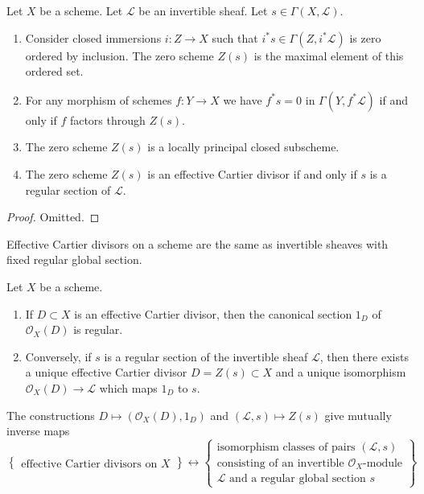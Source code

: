 \begin{lemma}
\label{lemma-zero-scheme}
Let $X$ be a scheme.
Let $\mathcal{L}$ be an invertible sheaf.
Let $s \in \Gamma(X, \mathcal{L})$.
\begin{enumerate}
\item Consider closed immersions $i : Z \to X$ such that
$i^*s \in \Gamma(Z, i^*\mathcal{L})$ is zero
ordered by inclusion. The zero scheme $Z(s)$ is the
maximal element of this ordered set.
\item For any morphism of schemes $f : Y \to X$ we have
$f^*s = 0$ in $\Gamma(Y, f^*\mathcal{L})$ if and only if
$f$ factors through $Z(s)$.
\item The zero scheme $Z(s)$ is a locally principal closed subscheme.
\item The zero scheme $Z(s)$ is an effective Cartier divisor
if and only if $s$ is a regular section of $\mathcal{L}$.
\end{enumerate}
\end{lemma}

\begin{proof}
Omitted.
\end{proof}

\begin{lemma}
\label{lemma-characterize-OD}
\begin{slogan}
Effective Cartier divisors on a scheme are the same as invertible sheaves
with fixed regular global section.
\end{slogan}
Let $X$ be a scheme.
\begin{enumerate}
\item If $D \subset X$ is an effective Cartier divisor, then
the canonical section $1_D$ of $\mathcal{O}_X(D)$ is regular.
\item Conversely, if $s$ is a regular section of the invertible
sheaf $\mathcal{L}$, then there exists a unique effective
Cartier divisor $D = Z(s) \subset X$ and a unique isomorphism
$\mathcal{O}_X(D) \to \mathcal{L}$ which maps $1_D$ to $s$.
\end{enumerate}
The constructions
$D \mapsto (\mathcal{O}_X(D), 1_D)$ and $(\mathcal{L}, s) \mapsto Z(s)$
give mutually inverse maps
$$
\left\{
\begin{matrix}
\text{effective Cartier divisors on }X
\end{matrix}
\right\}
\leftrightarrow
\left\{
\begin{matrix}
\text{isomorphism classes of pairs }(\mathcal{L}, s)\\
\text{consisting of an invertible }
\mathcal{O}_X\text{-module}\\
\mathcal{L}\text{ and a regular global section }s
\end{matrix}
\right\}
$$
\end{lemma}

